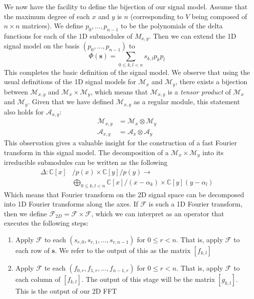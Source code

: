 \documentclass[12pt,technote]{IEEEtran}
\begin{document}
We now have the facility to define the bijection of our signal model. Assume that the maximum degree of each $x$ and $y$ is $n$ (corresponding to $V$ being composed of $n\times n$ matrices). We define $p_0, \dots, p_{n-1}$ to be the polynomials of the delta functions for each of the 1D submodules of $M_{x,y}$. Then we can extend the 1D signal model on the basis $(p_0, \dots, p_{n-1})$ to
\begin{equation*}
    \Phi(\mathbf{s}) = \sum_{0\leq k,l <n}s_{k,l}p_kp_l
\end{equation*}
This completes the basic definition of the signal model. We observe that using the usual definitions of the 1D signal models for $\mathcal{M}_x$ and $\mathcal{M}_y$, there exists a bijection between $\mathcal{M}_{x,y}$ and $\mathcal{M}_x\times \mathcal{M}_y$, which means that $\mathcal{M}_{x,y}$ is a \textit{tensor product} of $\mathcal{M}_x$ and $\mathcal{M}_y$. Given that we have defined $\mathcal{M}_{x,y}$ as a regular module, this statement also holds for $\mathcal{A}_{x,y}$:
\begin{align*}
    \mathcal{M}_{x,y} &= \mathcal{M}_x\otimes\mathcal{M}_y\\
    \mathcal{A}_{x,y} &= \mathcal{A}_x\otimes\mathcal{A}_y
\end{align*}
This observation gives a valuable insight for the construction of a fast Fourier transform in this signal model. The decomposition of a $\mathcal{M}_x\times \mathcal{M}_y$ into its irreducible submodules can be written as the following
\begin{align*}
    \Delta : \mathbb{C}[x]&/p(x)\times\mathbb{C}[y]/p(y)\to\\
    &\bigoplus_{0\leq k,l<n}\mathbb{C}[x]/(x - \alpha_k)\times \mathbb{C}[y](y - \alpha_{l})
\end{align*}
Which means that Fourier transform on the 2D signal space can be decomposed into 1D Fourier transforms along the axes. If $\mathcal{F}$ is such a 1D Fourier transform, then we define $\mathcal{F}_{2D} = \mathcal{F}\times \mathcal{F}$, which we can interpret as an operator that executes the following steps:
\begin{enumerate}
    \item Apply $\mathcal{F}$ to each $(s_{r,0}, s_{r,1}, \dots, s_{r,n-1})$ for $0\leq r < n$. That is, apply $\mathcal{F}$ to each row of $\mathbf{s}$. We refer to the output of this as the matrix $[f_{k,l}]$
    \item Apply $\mathcal{F}$ te each $(f_{0,r}, f_{1,r}, \dots, f_{n-1,r})$ for $0\leq r < n$. That is, apply $\mathcal{F}$ to each column of $[f_{k,l}]$. The output of this stage will be the matrix $[g_{k,l}]$. This is the output of our 2D FFT
\end{enumerate}
\end{document}

